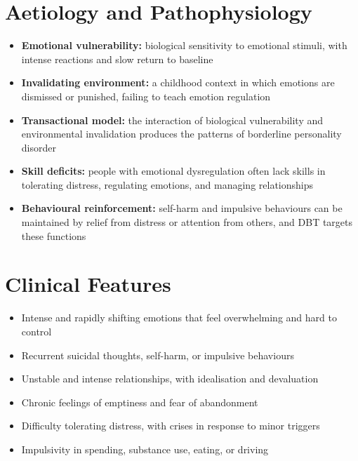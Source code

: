 \section*{Aetiology and Pathophysiology}
\begin{itemize}
    \item \textbf{Emotional vulnerability:} biological sensitivity to emotional stimuli, with intense reactions and slow return to baseline
    \item \textbf{Invalidating environment:} a childhood context in which emotions are dismissed or punished, failing to teach emotion regulation
    \item \textbf{Transactional model:} the interaction of biological vulnerability and environmental invalidation produces the patterns of borderline personality disorder
    \item \textbf{Skill deficits:} people with emotional dysregulation often lack skills in tolerating distress, regulating emotions, and managing relationships
    \item \textbf{Behavioural reinforcement:} self-harm and impulsive behaviours can be maintained by relief from distress or attention from others, and DBT targets these functions
\end{itemize}

\section*{Clinical Features}
\begin{itemize}
    \item Intense and rapidly shifting emotions that feel overwhelming and hard to control
    \item Recurrent suicidal thoughts, self-harm, or impulsive behaviours
    \item Unstable and intense relationships, with idealisation and devaluation
    \item Chronic feelings of emptiness and fear of abandonment
    \item Difficulty tolerating distress, with crises in response to minor triggers
    \item Impulsivity in spending, substance use, eating, or driving
\end{itemize}

